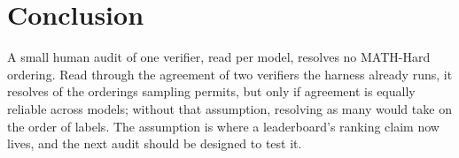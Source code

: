 \section{Conclusion}
\label{sec:conclusion}

A small human audit of one verifier, read per model, resolves no MATH-Hard
ordering. Read through the agreement of two verifiers the harness already
runs, it resolves \nJointComb{} of the \nCeiling{} orderings sampling permits,
but only if agreement is equally reliable across models; without that
assumption, resolving as many would take on the order of \nNPLabelsFull{}
labels. The assumption is where a leaderboard's ranking claim now lives, and
the next audit should be designed to test it.
